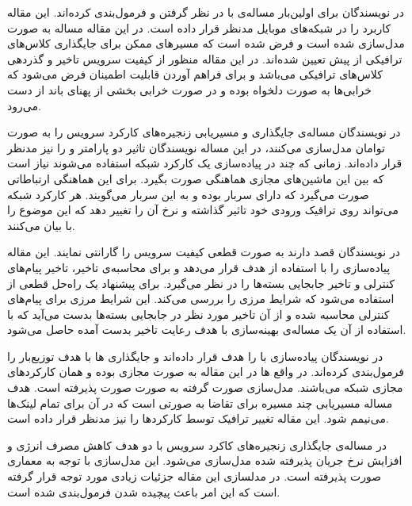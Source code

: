 در \cite{Yu2017}
نویسندگان برای اولین‌بار مساله‌ی 
با در نظر گرفتن  و 
فرمول‌بندی کرده‌اند.
این مقاله کاربرد  را در شبکه‌های موبایل مدنظر قرار داده است.
در این مقاله مساله به صورت 
مدل‌سازی شده است و فرض شده است که مسیرهای ممکن برای جایگذاری کلاس‌های ترافیکی از پیش تعیین شده‌اند.
در این مقاله منظور از کیفیت سرویس تاخیر و گذردهی کلاس‌های ترافیکی می‌باشد و 
برای فراهم آوردن قابلیت اطمینان فرض می‌شود که خرابی‌ها به صورت دلخواه بوده و در صورت خرابی‌
بخشی از پهنای باند از دست می‌رود.


در \cite{Huang2017}
نویسندگان مساله‌ی جایگذاری و مسیریابی زنجیره‌های کارکرد سرویس را به صورت توامان مدل‌سازی می‌کنند،
در این مساله نویسندگان تاثیر دو پارامتر  و 
را نیز مدنظر قرار داده‌اند.
زمانی که چند  در پیاده‌سازی یک کارکرد شبکه استفاده می‌شوند
نیاز است که بین این ماشین‌های مجازی هماهنگی صورت بگیرد.
برای این هماهنگی ارتباطاتی صورت می‌گیرد که دارای سربار بوده و به این سربار
 می‌گویند.
هر کارکرد شبکه می‌تواند روی ترافیک ورودی خود تاثیر گذاشته و نرخ آن را تغییر دهد
که این موضوع را با  بیان می‌کنند.

در \cite{Chen2017}
نویسندگان قصد دارند به صورت قطعی کیفیت سرویس را گارانتی نمایند.
این مقاله پیاده‌سازی  را با استفاده از  هدف قرار می‌دهد
و برای محاسبه‌ی تاخیر، تاخیر پیام‌های کنترلی  و
تاخیر جابجایی بسته‌ها را در نظر می‌گیرد.
برای پیشنهاد یک راه‌حل قطعی از 
استفاده می‌شود که شرایط مرزی را بررسی می‌کند.
این شرایط مرزی برای پیام‌های کنترلی محاسبه شده
و از آن تاخیر مورد نظر در جابجایی بسته‌ها بدست می‌آید
که با استفاده از آن یک مساله‌ی بهینه‌سازی با هدف رعایت تاخیر بدست آمده حاصل می‌شود.

در \cite{Ma2017}
نویسندگان پیاده‌سازی  با 
را هدف قرار داده‌اند و جایگذاری ها
با هدف توزیع‌بار را فرمول‌بندی کرده‌اند.
در واقع ها
در این مقاله به صورت مجازی بوده و همان کارکردهای مجازی شبکه می‌باشند.
مدل‌سازی صورت گرفته به صورت  صورت پذیرفته است.
هدف مساله مسیریابی چند مسیره برای تقاضا به صورتی است که در آن
 برای تمام لینک‌ها می‌نیمم شود.
این مقاله تغییر ترافیک توسط کارکردها را نیز مدنظر قرار داده است.

در \cite{Jang2017}
مساله‌ی جایگذاری زنجیره‌های کاکرد سرویس با دو هدف کاهش مصرف انرژی و افزایش نرخ جریان پذیرفته شده
مدل‌سازی می‌شود. این مدل‌سازی با توجه به معماری  صورت پذیرفته است.
در مدلسازی این مقاله جزئیات زیادی مورد توجه قرار گرفته است که این امر باعث پیچیده شدن
فرمول‌بندی شده است.

